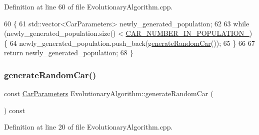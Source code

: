 Definition at line 60 of file Evolutionary\+Algorithm.\+cpp.


\begin{DoxyCode}
60                                                                             \{
61     std::vector<CarParameters> newly\_generated\_population;
62 
63     \textcolor{keywordflow}{while} (newly\_generated\_population.size() < \hyperlink{classEvolutionaryAlgorithm_af466ca42d5d03e212df4575f263f3a8c}{CAR\_NUMBER\_IN\_POPULATION\_}) \{
64         newly\_generated\_population.push\_back(\hyperlink{classEvolutionaryAlgorithm_a4f36e597080d9822c36837c8a582d4d0}{generateRandomCar}());
65     \}
66 
67     \textcolor{keywordflow}{return} newly\_generated\_population;
68 \}
\end{DoxyCode}
\mbox{\label{classEvolutionaryAlgorithm_a4f36e597080d9822c36837c8a582d4d0}} 
\subsubsection{\texorpdfstring{generate\+Random\+Car()}{generateRandomCar()}}
{\footnotesize\ttfamily const \hyperlink{classCarParameters}{Car\+Parameters} Evolutionary\+Algorithm\+::generate\+Random\+Car (\begin{DoxyParamCaption}{ }\end{DoxyParamCaption}) const\hspace{0.3cm}{\ttfamily [private]}}



Definition at line 20 of file Evolutionary\+Algorithm.\+cpp.


